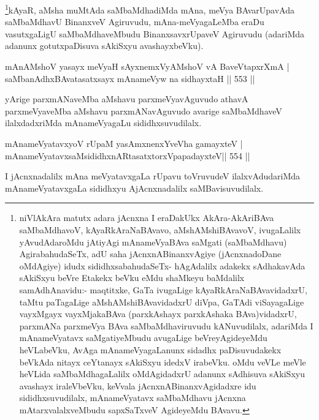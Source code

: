 \begin{artha}
\footnote{niVlAkAra matutx adara jAcnxna I eraDakUkx AkAra-AkAriBAva saMbaMdhavoV, kAyaRkAraNaBAvavo, aMshAMshiBAvavoV, ivugaLalilx yAvudAdaroMdu jAtiyAgi mAnameVyaBAva saMgati (saMbaMdhavu) AgirabahudaSeTx, adU saha jAcnxnABinanxvAgiye (jAcnxnadoDane oMdAgiye) idudx sididhxsabahudaSeTx- hAgAdalilx adakekx sAdhakavAda sAkiSxyu beVre Etakekx beVku eMdu shaMkeyu baMdalilx samAdhAnavidu:- maqtitxke, GaTa ivugaLige kAyaRkAraNaBAvavidadxrU, taMtu paTagaLige aMshAMshiBAvavidadxrU diVpa, GaTAdi viSayagaLige vayxMgayx vayxMjakaBAva (parxkAshayx parxkAshaka BAva)vidadxrU, parxmANa parxmeVya BAva saMbaMdhaviruvudu kANuvudilalx, adariMda I mAnameVyatavx saMgatiyeMbudu avugaLige beVreyAgideyeMdu heVLabeVku, AvAga mAnameVyagaLanunx sidadhx paDisuvudakekx beVkAda nitayx ceYtanayx sAkiSxyu idedxV irabeVku. oMdu veVLe meVle heVLida saMbaMdhagaLalilx oMdAgidadxrU adanunx sAdhisuva sAkiSxyu avashayx iraleVbeVku, keVvala jAcnxnABinanxvAgidadxre idu sididhxsuvudilalx, mAnameVyatavx saMbaMdhavu jAcnxna mAtarxvalalxveMbudu sapxSaTxveV AgideyeMdu BAvavu.}kAyaR, aMsha muMtAda saMbaMdhadiMda mAna, meVya BAvarUpavAda saMbaMdhavU BinanxveV Agiruvudu, mAna-meVyagaLeMba eraDu vasutxgaLigU saMbaMdhaveMbudu BinanxsavxrUpaveV Agiruvudu (adariMda adanunx gotutxpaDisuva sAkiSxyu avashayxbeVku).
\end{artha}


\begin{shl}
mAnAMshoV yasayx meVyaH sAyxnemxVyAMshoV vA BaveVtapxrXmA | \\
saMbanAdhxBAvatasatxsayx mAnameVyw na sidhayxtaH \hfill||  553 ||  
\end{shl}

\begin{artha}
yArige parxmANaveMba aMshavu parxmeVyavAguvudo athavA parxmeVyaveMba aMshavu parxmANavAguvudo avarige saMbaMdhaveV ilalxdadxriMda mAnameVyagaLu sididhxsuvudilalx.
\end{artha}

\begin{shl}
mAnameVyatavxyoV rUpaM yasAmxnenxYveVha gamayxteV | \\
mAnameVyatavxsaMsididhxnARtasatxtorxVpapadayxteV\hfill ||  554 ||  
\end{shl}

\begin{artha}
I jAcnxnadalilx mAna meVyatavxgaLa rUpavu toVruvudeV ilalxvAdudariMda mAnameVyatavxgaLa sididhxyu AjAcnxnadalilx saMBavisuvudilalx.
\end{artha}

